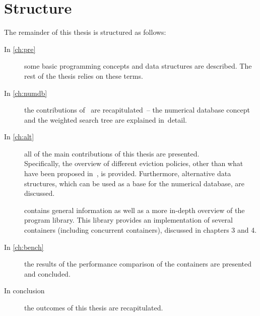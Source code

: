 \section{Structure}
The remainder of this thesis is structured as follows:
 \begin{description}
 \item[In \cref{ch:pre}] some basic programming concepts and data structures are described. The rest of the thesis relies on these terms.
 \item[In \cref{ch:numdb}] the contributions of~\cite{park90} are recapitulated~-- the numerical database concept and the weighted search tree are explained in~detail.
 \item[In \cref{ch:alt}] all of the main contributions of this thesis are presented. \\ Specifically, the overview of different eviction policies, other than what have been proposed in~\cite{park90}, is provided. Furthermore, alternative data structures, which can be used as a base for the numerical database, are discussed.

 \item [] contains general information as well as a more in-depth overview of the \numdbname{} program library. This library provides an implementation of several containers (including concurrent containers), discussed in chapters 3 and 4.

 \item [In \cref{ch:bench}] the results of the performance comparison of the containers are presented and concluded.

 \item [In conclusion] the outcomes of this thesis are recapitulated.

\end{description}
